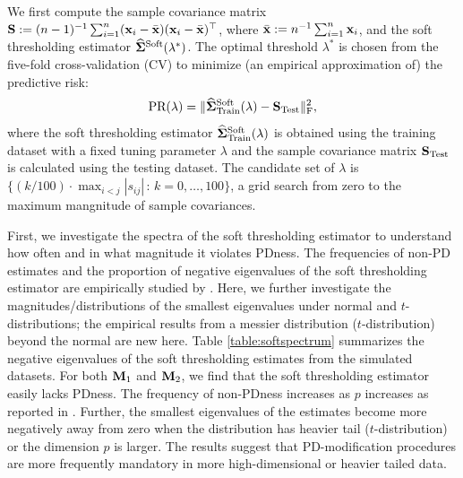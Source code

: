 \documentclass[times,sort&compress,3p]{elsarticle}
\begin{document}
We first compute the sample covariance matrix ${\bf S} : = (n-1)^{-1}\sum_{i=1}^{n} ({\bf x}_i - \bar{\bf x}) ({\bf x}_i - \bar{\bf x})^{\top}$,
where $\bar{\bf x} := n^{-1}\sum_{i=1}^{n}{\bf x}_i$, and
the soft thresholding estimator $\widehat{\bf \Sigma}^{\rm Soft}({\lambda^*})$. 
The optimal threshold $\lambda^*$ is chosen from the five-fold cross-validation (CV) to minimize (an empirical approximation of) the predictive risk:
\[
{\rm PR(\lambda)} = \|\widehat{\bf{\Sigma}}_{\rm Train}^{\rm Soft}(\lambda) - {\bf S}_{\rm Test}\|_{\rm F}^2,
\]
where the soft thresholding estimator $\widehat{\bf{\Sigma}}_{\rm Train}^{\rm Soft}(\lambda)$ is obtained using the training dataset with a fixed tuning parameter $\lambda$ and the sample covariance matrix ${\bf S}_{\rm Test}$ is calculated using the testing dataset.
The candidate set of $\lambda$ is 
 $\big\{ (k/100) \cdot \max_{i < j} |s_{ij}| \,:\, k = 0, \ldots, 100 \big\}$, a grid search from zero to the maximum mangnitude of sample covariances.
 

First, we investigate the spectra of the soft thresholding estimator to understand
how often and in what magnitude it violates PDness. 
The frequencies of non-PD estimates and the proportion of negative eigenvalues 
of the soft thresholding estimator are empirically studied by \citet{Xue2012}. Here, 
we further investigate the magnitudes/distributions of the smallest eigenvalues under normal and $t$-distributions;  
the empirical results from a messier distribution ($t$-distribution) beyond the normal are new here. 
Table \ref{table:softspectrum}
summarizes the negative eigenvalues of the soft thresholding estimates from
the simulated datasets. 
For both ${\bf M}_1$ and ${\bf M}_2$, we find
that the soft thresholding estimator easily lacks PDness.
The frequency of non-PDness increases as $p$ increases as reported in \citet{Xue2012}. Further,
the smallest eigenvalues of the estimates become more negatively away from zero 
when the distribution has heavier tail ($t$-distribution) or the dimension $p$ is larger. The results suggest 
that PD-modification procedures are more frequently mandatory in more high-dimensional or heavier tailed data.
\end{document}
